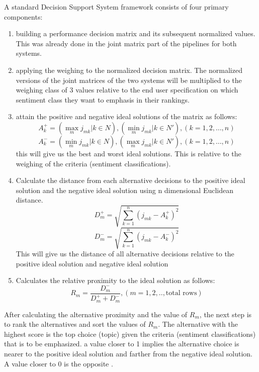 A standard Decision Support System framework consists of four primary components:
\begin{enumerate}
	\item building a performance decision matrix and its subsequent normalized values. This was already done in the joint matrix part of the pipelines for both systems.
	\item applying the weighing to the normalized decision matrix.
	The normalized versions of the joint matrices of the two systems will be multiplied to the weighing class of 3 values relative to the end user specification on which sentiment class they want to emphasis in their rankings.
	\item attain the positive and negative ideal solutions of the matrix as follows:
	\begin{equation*}
		A_{k}^+ = {(\max_m j_{mk}|k \in N), (\min_m j_{mk}|k \in N'), (k = 1,2, … ,n) }
	\end{equation*}
	\begin{equation*}
		A_{k}^- = {(\min_m j_{mk}|k \in N), (\max_m j_{mk}|k \in N'), (k = 1,2, … , n) }
	\end{equation*}
	this will give us the best and worst ideal solutions. This is relative to the weighing of the criteria (sentiment classifications).
	\item Calculate the distance from each alternative decisions to the
	positive ideal solution and the negative ideal solution using n
	dimensional Euclidean distance.
	\begin{equation*}
		D_{m}^+ = \sqrt{\sum_{k=1}^{n} (j_{mk} - A_{k}^+)^2}
	\end{equation*}
	\begin{equation*}
		D_{m}^- = \sqrt{\sum_{k=1}^{n} (j_{mk} - A_{k}^-)^2}
	\end{equation*}
	This will give us the distance of all alternative decisions relative to the positive ideal solution and negative ideal solution
	\item Calculates the relative proximity to the ideal
	solution as follows:
	\begin{equation*}
		R_m = \frac{D_{m}^-}{D_{m}^{+} + D_{m}^-}, (m = 1,2,..,\text{total rows})
	\end{equation*}
\end{enumerate}

After calculating the alternative proximity and the value of $R_m$, the next step is to rank the alternatives and sort the values of $R_m$. The alternative with the highest score is the top choice (topic) given the criteria (sentiment classifications) that is to be emphasized. a value closer to 1 implies the alternative choice is nearer to the positive ideal solution and farther from the negative ideal solution. A value closer to 0 is the opposite \parencite{daniati2021topsis}.

